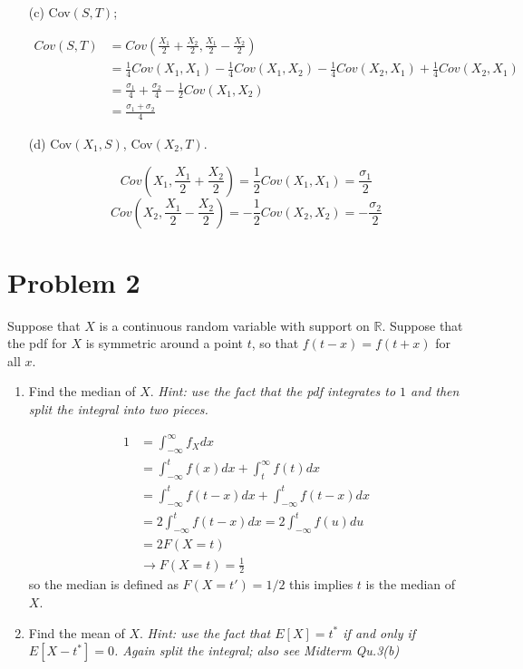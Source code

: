 \documentclass{article}
\newcommand{\1}{\mathbf{1}}
\begin{document}
\begin{enumerate}
    \item[(c)] Cov$(S,T)$;

    \begin{align*}
        Cov(S, T) &= Cov\left(\frac{X_1}{2}+\frac{X_2}{2}, \frac{X_1}{2}-\frac{X_2}{2} \right) \\
        &= \frac{1}{4} Cov(X_1, X_1) - \frac{1}{4} Cov(X_1, X_2) - \frac{1}{4}Cov(X_2, X_1) + \frac{1}{4} Cov(X_2, X_1)\\
        &= \frac{\sigma_1}{4} + \frac{\sigma_2}{4} - \frac{1}{2}Cov(X_1, X_2) \\
        &= \frac{\sigma_1 + \sigma_2}{4}
    \end{align*}

    \item[(d)] Cov$(X_1,S)$, Cov$(X_2,T)$.
    
    $$Cov\left(X_1, \frac{X_1}{2}+\frac{X_2}{2}\right) = \frac{1}{2} Cov(X_1, X_1) =  \frac{\sigma_1}{2} $$
    $$Cov\left(X_2, \frac{X_1}{2}-\frac{X_2}{2}\right) = -\frac{1}{2} Cov(X_2, X_2) =  -\frac{\sigma_2}{2} $$
\end{enumerate}



\newpage
\section*{Problem 2}
Suppose that $X$ is a continuous random variable with support on $\mathbb{R}$. Suppose that the pdf for $X$ is symmetric around a point $t$, so that $f(t-x) = f(t+x)$ for all $x$.
\begin{enumerate}
    \item Find the median of $X$. {\it Hint: use the fact that the pdf integrates to $1$ and then split the integral into two pieces.}
    
    \begin{align*}
        1 &= \int_{-\infty}^\infty f_X dx \\
        &= \int_{-\infty}^t f(x)dx + \int_t^\infty f(t)dx \\
        &= \int_{-\infty}^t f(t-x)dx + \int_{-\infty}^t f(t-x)dx \\
        &= 2\int_{-\infty}^t f(t-x)dx = 2\int_{-\infty}^t f(u)du \\
        &= 2F(X=t) \\
        &\rightarrow F(X=t) = \frac{1}{2}
    \end{align*}
    so the median is defined as $F(X=t')=1/2$ this implies $t$ is the median of $X$.
    
    \item Find the mean of $X$. {\it Hint: use the fact that $E[X] = t^*$ if and only if $E[X-t^*]=0$. Again split the integral; also see Midterm Qu.3(b)} 
    
\end{enumerate}
\end{document}
